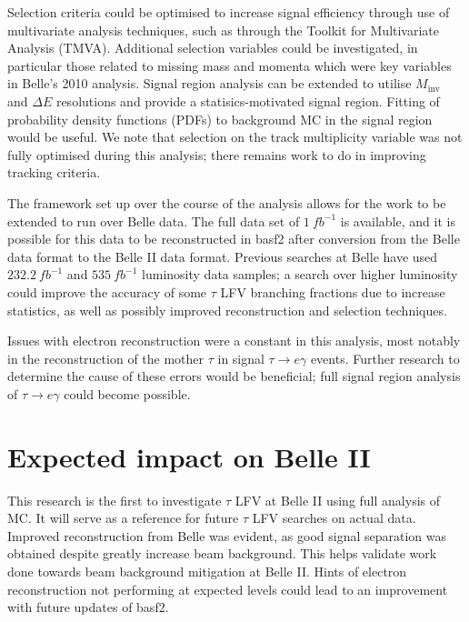 \documentclass[12pt]{thesis}  %
\begin{document}
Selection criteria could be optimised to increase signal efficiency through use of multivariate analysis techniques, such as through the Toolkit for Multivariate Analysis (TMVA). Additional selection variables could be investigated, in particular those related to missing mass and momenta which were key variables in Belle's 2010 analysis. Signal region analysis can be extended to utilise $M_{\text{inv}}$ and $\Delta E$ resolutions and provide a statisics-motivated signal region. Fitting of probability density functions (PDFs) to background MC in the signal region would be useful. We note that selection on the track multiplicity variable was not fully optimised during this analysis; there remains work to do in improving tracking criteria.

The framework set up over the course of the analysis allows for the work to be extended to run over Belle data. The full data set of $\SI{1}{fb^{-1}}$ is available, and it is possible for this data to be reconstructed in basf2 after conversion from the Belle data format to the Belle II data format. Previous searches at Belle have used $\SI{232.2}{fb^{-1}}$ and $\SI{535}{fb^{-1}}$ luminosity data samples; a search over higher luminosity could improve the accuracy of some $\tau$ LFV branching fractions due to increase statistics, as well as possibly improved reconstruction and selection techniques.

Issues with electron reconstruction were a constant in this analysis, most notably in the reconstruction of the mother $\tau$ in signal $\tau\to e\gamma$ events. Further research to determine the cause of these errors would be beneficial; full signal region analysis of $\tau\to e\gamma$ could become possible.

\section{Expected impact on Belle II}

This research is the first to investigate $\tau$ LFV at Belle II using full analysis of MC. It will serve as a reference for future $\tau$ LFV searches on actual data. Improved reconstruction from Belle was evident, as good signal separation was obtained despite greatly increase beam background. This helps validate work done towards beam background mitigation at Belle II. Hints of electron reconstruction not performing at expected levels could lead to an improvement with future updates of basf2.

\newpage


\end{document}
